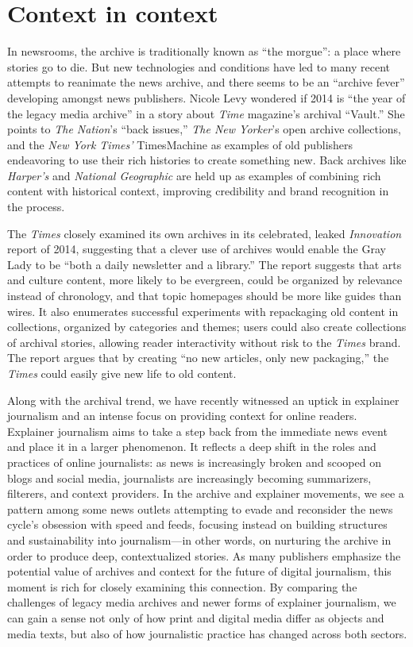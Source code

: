 \section{Context in context}

In newsrooms, the archive is traditionally known as ``the morgue'': a place where stories go to die. But new technologies and conditions have led to many recent attempts to reanimate the news archive, and there seems to be an ``archive fever'' developing amongst news publishers. Nicole Levy wondered if 2014 is ``the year of the legacy media archive'' in a story about \emph{Time} magazine's archival ``Vault.''\autocite{levy_time.com_2014} She points to \emph{The Nation}'s ``back issues,'' \emph{The New Yorker}'s open archive collections, and the \emph{New York Times'} TimesMachine as examples of old publishers endeavoring to use their rich histories to create something new. Back archives like \emph{Harper's} and \emph{National Geographic} are held up as examples of combining rich content with historical context, improving credibility and brand recognition in the process.

The \emph{Times} closely examined its own archives in its celebrated, leaked \emph{Innovation} report of 2014, suggesting that a clever use of archives would enable the Gray Lady to be ``both a daily newsletter and a library.''\autocite[28]{_innovation_2014} The report suggests that arts and culture content, more likely to be evergreen, could be organized by relevance instead of chronology, and that topic homepages should be more like guides than wires. It also enumerates successful experiments with repackaging old content in collections, organized by categories and themes; users could also create collections of archival stories, allowing reader interactivity without risk to the \emph{Times} brand. The report argues that by creating ``no new articles, only new packaging,'' the \emph{Times} could easily give new life to old content.\autocite[34]{_innovation_2014}

Along with the archival trend, we have recently witnessed an uptick in explainer journalism and an intense focus on providing context for online readers. Explainer journalism aims to take a step back from the immediate news event and place it in a larger phenomenon. It reflects a deep shift in the roles and practices of online journalists: as news is increasingly broken and scooped on blogs and social media, journalists are increasingly becoming summarizers, filterers, and context providers. In the archive and explainer movements, we see a pattern among some news outlets attempting to evade and reconsider the news cycle's obsession with speed and feeds, focusing instead on building structures and sustainability into journalism---in other words, on nurturing the archive in order to produce deep, contextualized stories. As many publishers emphasize the potential value of archives and context for the future of digital journalism, this moment is rich for closely examining this connection. By comparing the challenges of legacy media archives and newer forms of explainer journalism, we can gain a sense not only of how print and digital media differ as objects and media texts, but also of how journalistic practice has changed across both sectors.

